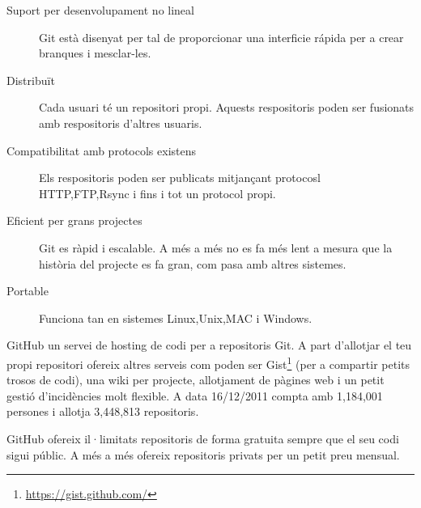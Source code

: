 \begin{description}
    \item[Suport per desenvolupament no lineal] Git està disenyat per tal de proporcionar una interficie rápida per a crear branques i mesclar-les.
    \item[Distribuït] Cada usuari té un repositori propi. Aquests respositoris poden ser fusionats amb respositoris d'altres usuaris.
    \item[Compatibilitat amb protocols existens] Els respositoris poden ser publicats mitjançant protocosl HTTP,FTP,Rsync i fins i tot un protocol propi.
    \item[Eficient per grans projectes] Git es ràpid i escalable. A més a més no es fa més lent a mesura que la història del projecte es fa gran, com pasa amb altres sistemes.
    \item[Portable] Funciona tan en sistemes Linux,Unix,MAC i Windows.
\end{description}

GitHub un servei de hosting de codi per a repositoris Git. A part d'allotjar el teu propi repositori ofereix altres serveis com poden ser Gist\footnote{\url{https://gist.github.com/}} (per a compartir petits trosos de codi), una wiki per projecte, allotjament de pàgines web i un petit gestió d'incidències molt flexible. A data 16/12/2011 compta amb 1,184,001 persones i allotja 3,448,813 repositoris.

GitHub ofereix il·limitats repositoris de forma gratuita sempre que el seu codi sigui públic. A més a més ofereix repositoris privats per un petit preu mensual. 


